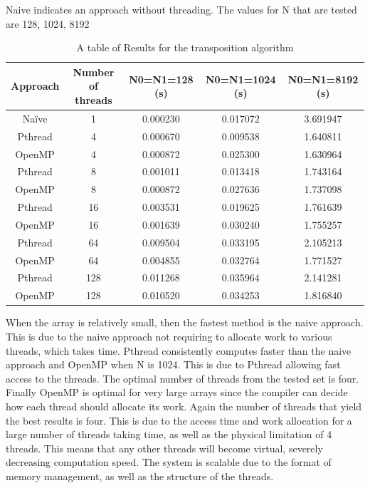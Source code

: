 \documentclass[conference]{IEEEtran}
\begin{document}
\noindent Naive indicates an approach without threading. The values for N that are tested are 128, 1024, 8192\\

\begin{table}[H]
\centering
\caption{A table of Results for the transposition algorithm} 
\begin{tabular}{|c|c|c|c|c|}
  \hline
 Approach & Number of threads & N0=N1=128 (s) & N0=N1=1024 (s) & N0=N1=8192 (s) \\
\hline

Naïve	&   1	& 0.000230	  & 0.017072    &   3.691947\\
\hline
Pthread	&   4	& 0.000670	  & 0.009538    &   1.640811\\
\hline
OpenMP	&   4	& 0.000872    & 0.025300    &  	1.630964\\ 
\hline
Pthread	&   8	& 0.001011	  & 0.013418    &	1.743164\\
\hline
OpenMP	&   8	& 0.000872    & 0.027636    &  	1.737098\\
\hline
Pthread	&   16  & 0.003531	  & 0.019625	&   1.761639\\
\hline
OpenMP	&   16  & 0.001639    & 0.030240    &  	1.755257\\
\hline
Pthread	&   64  & 0.009504	  & 0.033195    &	2.105213\\
\hline
OpenMP	&   64  & 0.004855    & 0.032764    &  	1.771527\\
\hline
Pthread	&   128 & 0.011268    &	0.035964    &  	2.141281\\  
\hline
OpenMP	&   128 & 0.010520    & 0.034253    & 	1.816840\\

\hline
\end{tabular}

\end{table} 

When the array is relatively small, then the fastest method is the naive approach. This is due to the naive approach not requiring to allocate work to various threads, which takes time. Pthread consistently computes faster than the naive approach and OpenMP when N is 1024. This is due to Pthread allowing fast access to the threads. The optimal number of threads from the tested set is four. Finally OpenMP is optimal for very large arrays since the compiler can decide how each thread should allocate its work. Again the number of threads that yield the best results is four. This is due to the access time and work allocation for a large number of threads taking time, as well as the physical limitation of 4 threads. This means that any other threads will become virtual, severely decreasing computation speed. The system is scalable due to the format of memory management, as well as the structure of the threads.\\
\end{document}
